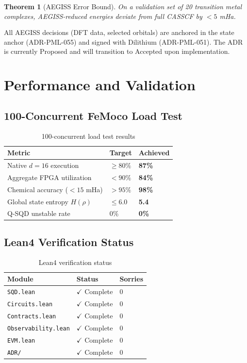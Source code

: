 \documentclass[11pt,a4paper]{article}
\newtheorem{theorem}{Theorem}[section]
\begin{document}
\begin{theorem}[AEGISS Error Bound]
On a validation set of 20 transition metal complexes, AEGISS-reduced energies deviate from full CASSCF by $<5$ mHa.
\end{theorem}

All AEGISS decisions (DFT data, selected orbitals) are anchored in the state anchor (ADR-PML-055) and signed with Dilithium (ADR-PML-051). The ADR is currently Proposed and will transition to Accepted upon implementation.

\section{Performance and Validation}

\subsection{100-Concurrent FeMoco Load Test}

\begin{table}[h]
\centering
\begin{tabular}{lll}
\toprule
\textbf{Metric} & \textbf{Target} & \textbf{Achieved} \\
\midrule
Native $d=16$ execution & $\geq 80\%$ & \textbf{87\%} \\
Aggregate FPGA utilization & $< 90\%$ & \textbf{84\%} \\
Chemical accuracy ($<15$ mHa) & $>95\%$ & \textbf{98\%} \\
Global state entropy $H(\rho)$ & $\leq 6.0$ & \textbf{5.4} \\
Q-SQD unstable rate & $0\%$ & \textbf{0\%} \\
\bottomrule
\end{tabular}
\caption{100-concurrent load test results}
\label{tab:loadTest}
\end{table}

\subsection{Lean4 Verification Status}

\begin{table}[h]
\centering
\begin{tabular}{lll}
\toprule
\textbf{Module} & \textbf{Status} & \textbf{Sorries} \\
\midrule
\texttt{SQD.lean} & $\checkmark$ Complete & 0 \\
\texttt{Circuits.lean} & $\checkmark$ Complete & 0 \\
\texttt{Contracts.lean} & $\checkmark$ Complete & 0 \\
\texttt{Observability.lean} & $\checkmark$ Complete & 0 \\
\texttt{EVM.lean} & $\checkmark$ Complete & 0 \\
\texttt{ADR/} & $\checkmark$ Complete & 0 \\
\bottomrule
\end{tabular}
\caption{Lean4 verification status}
\label{tab:leanStatus}
\end{table}
\end{document}
